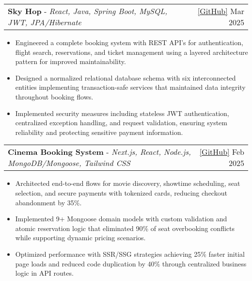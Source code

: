 \documentclass[letterpaper,10pt]{article}
\makeatletter
\newcommand{\resumeItem}[1]{
  \item\small{
    {#1 \vspace{-3pt}}
  }
}
\newcommand{\resumeProjectHeading}[4]{
    \item
    \begin{tabular*}{0.97\textwidth}{l@{\extracolsep{\fill}}r}
      \small\textbf{#1} - \small\emph{#2} & \small\href{#4}{[GitHub]} \hspace{0.5em} #3 \\
    \end{tabular*}\vspace{-5pt}
}
\newcommand{\resumeItemListStart}{\begin{itemize}}
\newcommand{\resumeItemListEnd}{\end{itemize}\vspace{-6pt}}
\makeatother
\begin{document}
    \resumeProjectHeading
          {Sky Hop} {React, Java, Spring Boot, MySQL, JWT, JPA/Hibernate}{Mar 2025}{https://github.com/venu284/Flight-Booking.git}
          \resumeItemListStart
            \resumeItem{Engineered a complete booking system with REST API's for authentication, flight search, reservations, and ticket management using a layered architecture pattern for improved maintainability.}
            \resumeItem{Designed a normalized relational database schema with six interconnected entities implementing transaction-safe services that maintained data integrity throughout booking flows.}
            \resumeItem{Implemented security measures including stateless JWT authentication, centralized exception handling, and request validation, ensuring system reliability and protecting sensitive payment information.}
          \resumeItemListEnd

    
      \resumeProjectHeading
          {Cinema Booking System}{Next.js, React, Node.js, MongoDB/Mongoose, Tailwind CSS}{Feb 2025}{https://github.com/venu284/e-cinema-booking.git}
          \resumeItemListStart
            \resumeItem{Architected end-to-end flows for movie discovery, showtime scheduling, seat selection, and secure payments with tokenized cards, reducing checkout abandonment by 35\%.}
            \resumeItem{Implemented 9+ Mongoose domain models with custom validation and atomic reservation logic that eliminated 90\% of seat overbooking conflicts while supporting dynamic pricing scenarios.}
            \resumeItem{Optimized performance with SSR/SSG strategies achieving 25\% faster initial page loads and reduced code duplication by 40\% through centralized business logic in API routes.}
          \resumeItemListEnd
          
\end{document}

